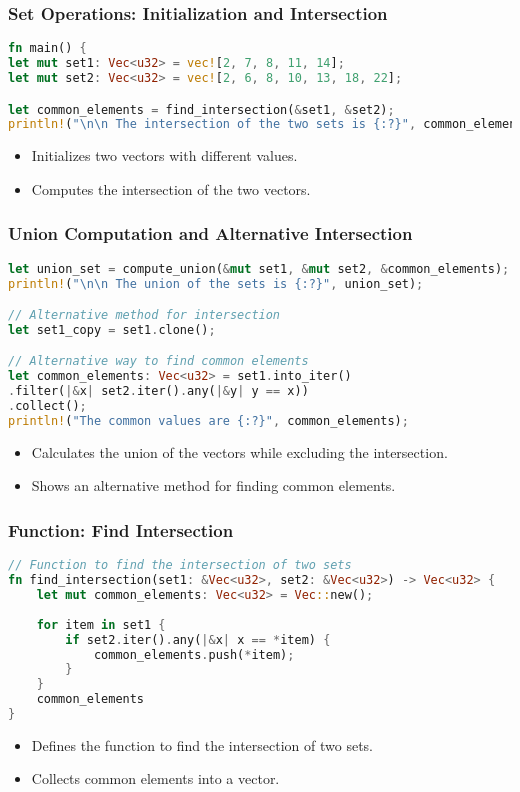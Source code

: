 \documentclass[aspectratio=169, table]{beamer}
\begin{document}
\begin{frame}[fragile]
\frametitle{Set Operations: Initialization and Intersection}
\begin{lstlisting}[language=Rust]
fn main() {
let mut set1: Vec<u32> = vec![2, 7, 8, 11, 14];
let mut set2: Vec<u32> = vec![2, 6, 8, 10, 13, 18, 22];

let common_elements = find_intersection(&set1, &set2);
println!("\n\n The intersection of the two sets is {:?}", common_elements);
\end{lstlisting}
\begin{itemize}
\item Initializes two vectors with different values.
\item Computes the intersection of the two vectors.
\end{itemize}
\end{frame}

\begin{frame}[fragile]
\frametitle{\Large{Union Computation and Alternative Intersection}}
\vspace{10pt}
\begin{lstlisting}[language=Rust]
let union_set = compute_union(&mut set1, &mut set2, &common_elements);
println!("\n\n The union of the sets is {:?}", union_set);

// Alternative method for intersection
let set1_copy = set1.clone();

// Alternative way to find common elements
let common_elements: Vec<u32> = set1.into_iter()
.filter(|&x| set2.iter().any(|&y| y == x))
.collect();
println!("The common values are {:?}", common_elements);
\end{lstlisting}
\begin{itemize}
\item Calculates the union of the vectors while excluding the intersection.
\item Shows an alternative method for finding common elements.
\end{itemize}
\end{frame}

\begin{frame}[fragile]
\frametitle{Function: Find Intersection}
\vspace{10pt}
\begin{lstlisting}[language=Rust]
// Function to find the intersection of two sets
fn find_intersection(set1: &Vec<u32>, set2: &Vec<u32>) -> Vec<u32> {
	let mut common_elements: Vec<u32> = Vec::new();
	
	for item in set1 {
		if set2.iter().any(|&x| x == *item) {
			common_elements.push(*item);
		}
	}
	common_elements
}
\end{lstlisting}
\begin{itemize}
\item Defines the function to find the intersection of two sets.
\item Collects common elements into a vector.
\end{itemize}
\end{frame}
\end{document}
